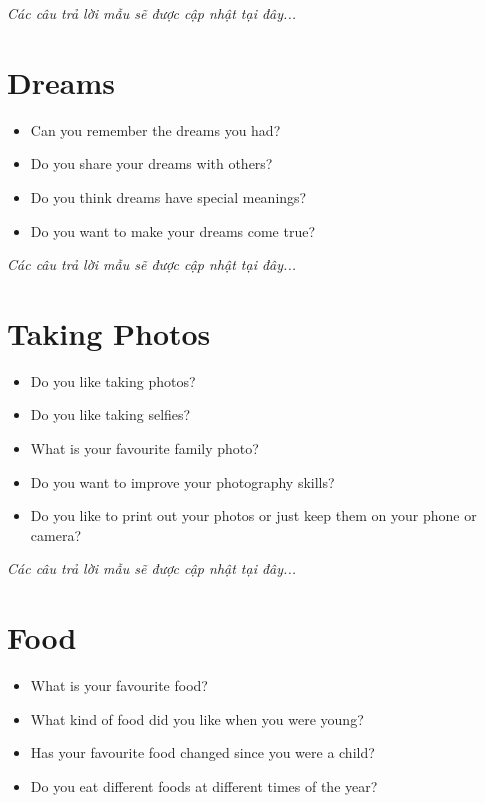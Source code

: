 \vspace{1em}
\textit{Các câu trả lời mẫu sẽ được cập nhật tại đây...}
\vspace{2em}

\section{Dreams}
\begin{ieltsprompt}
\begin{itemize}[itemsep=4pt]
    \item Can you remember the dreams you had?
    \item Do you share your dreams with others?
    \item Do you think dreams have special meanings?
    \item Do you want to make your dreams come true?
\end{itemize}
\end{ieltsprompt}

\vspace{1em}
\textit{Các câu trả lời mẫu sẽ được cập nhật tại đây...}
\vspace{2em}

\section{Taking Photos}
\begin{ieltsprompt}
\begin{itemize}[itemsep=4pt]
    \item Do you like taking photos?
    \item Do you like taking selfies?
    \item What is your favourite family photo?
    \item Do you want to improve your photography skills?
    \item Do you like to print out your photos or just keep them on your phone or camera?
\end{itemize}
\end{ieltsprompt}

\vspace{1em}
\textit{Các câu trả lời mẫu sẽ được cập nhật tại đây...}
\vspace{2em}

\section{Food}
\begin{ieltsprompt}
\begin{itemize}[itemsep=4pt]
    \item What is your favourite food?
    \item What kind of food did you like when you were young?
    \item Has your favourite food changed since you were a child?
    \item Do you eat different foods at different times of the year?
\end{itemize}
\end{ieltsprompt}

